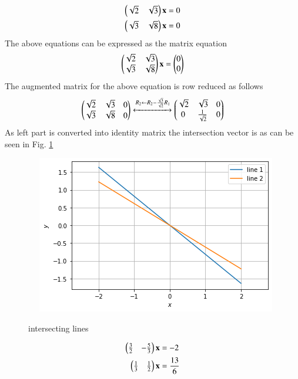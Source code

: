 \item
\begin{align}
\begin{split}
\begin{pmatrix}\sqrt{2}& \sqrt{3} \end{pmatrix}\mathbf{x}&=0
\\
\begin{pmatrix}\sqrt{3}& \sqrt{8} \end{pmatrix}\mathbf{x}&=0
\end{split}
\end{align}
The above equations can be expressed as the matrix equation
\begin{align}
\begin{pmatrix}\sqrt{2} & \sqrt {3}\\\sqrt{3} & \sqrt{8}\end{pmatrix} \mathbf{x} = \begin{pmatrix}0\\0\end{pmatrix}
\end{align}
%
The augmented matrix for the above equation is row reduced as follows
\begin{align}
\begin{pmatrix}\sqrt{2} & \sqrt{3}& 0\\\sqrt {3}& \sqrt{8}& 0\end{pmatrix} 
\xleftrightarrow {R_2\leftarrow R_2-\frac{\sqrt{3}}{\sqrt{2}}R_1}\begin{pmatrix}\sqrt{2}& \sqrt{3}& 0\\0 & \frac{1}{\sqrt{2}}& 0\end{pmatrix}
\\ 
\end{align}%
As left part is converted into identity matrix the intersection vector is as can be seen in Fig.     \ref{linform/2/10/ef/fig:intersecting lines.}
%
\begin{figure}[ht!]
    \centering
    \includegraphics[width=\columnwidth]{solutions/su2021/2/10/ef/Figure2(1).png}
    \caption{intersecting lines}
    \label{linform/2/10/ef/fig:intersecting lines.}
\end{figure} 
\item \begin{align}
\begin{split}
\begin{pmatrix}\frac{3}{2} & -\frac{5}{3} \end{pmatrix}\mathbf{x}&=-2
\\
\begin{pmatrix}\frac{1}{3} & \frac{1}{2}\end{pmatrix}\mathbf{x}&=\frac {13}{6}
\end{split}
\end{align}
